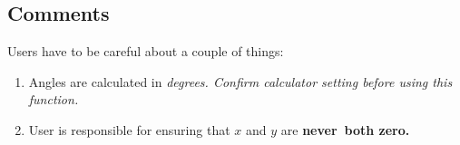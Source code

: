 	\subsection*{Comments}
	Users have to be careful about a couple of things:
	\begin{enumerate}
	\item Angles are calculated in \it{degrees}\rm.  Confirm calculator setting before using this function.
	\item User is responsible for ensuring that $x$ and $y$ are \bf{never}\rm\ both zero.
	\end{enumerate}
	
